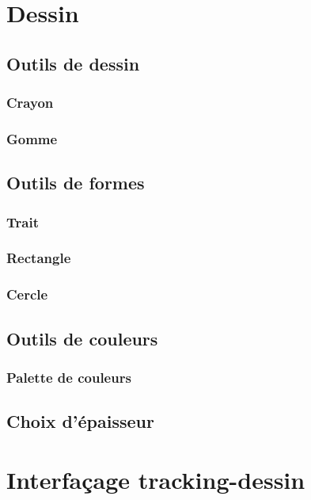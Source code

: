 \documentclass[11pt,a4paper,oldfontcommands]{memoir}
\begin{document}
\section{Dessin}

\subsection{Outils de dessin}

\subsubsection{Crayon}

\subsubsection{Gomme}

\subsection{Outils de formes}

\subsubsection{Trait}

\subsubsection{Rectangle}

\subsubsection{Cercle}

\subsection{Outils de couleurs}

\subsubsection{Palette de couleurs}

\subsection{Choix d'épaisseur}

\section{Interfaçage tracking-dessin}
\end{document}
